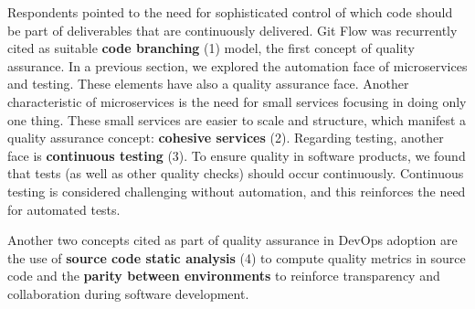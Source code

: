 Respondents pointed to the need for sophisticated control of which code should
be part of deliverables that are continuously delivered. Git Flow was
recurrently cited as suitable \textbf{code branching} (1) model, the first
concept of quality assurance.
In a previous section, we explored the automation face of
microservices and testing. These elements have also a quality assurance face.
Another characteristic of microservices is the need for small services focusing
in doing only one thing. These small services are easier to scale and
structure, which manifest a quality assurance concept: \textbf{cohesive
services} (2). Regarding testing, another face is \textbf{continuous
testing} (3). To ensure quality in software products, we found that
tests (as well as other quality checks) should occur continuously. Continuous testing
is considered challenging without automation, and this reinforces the need for automated 
tests.

Another two concepts cited as part of quality assurance in DevOps adoption are
the use of \textbf{source code static analysis} (4) to compute quality metrics in
source code and the \textbf{parity between environments} to
reinforce transparency and collaboration during software development.
